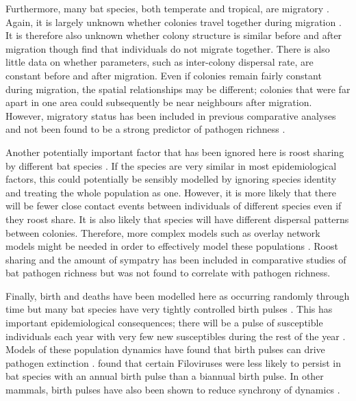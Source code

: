 Furthermore, many bat species, both temperate and tropical, are migratory \cite{fleming2003ecology, krauel2013recent, popa2009bats, hutterer2005bat}.
Again, it is largely unknown whether colonies travel together during migration \cite{baerwald2016migratory}. 
It is therefore also unknown whether colony structure is similar before and after migration \cite{carter2013cooperation} though \textcite{kurta2002philopatry} find that individuals do not migrate together.
There is also little data on whether parameters, such as inter-colony dispersal rate, are constant before and after migration.
Even if colonies remain fairly constant during migration, the spatial relationships may be different; colonies that were far apart in one area could subsequently be near neighbours after migration.
However, migratory status has been included in previous comparative analyses and not been found to be a strong predictor of pathogen richness \cite{turmelle2009correlates, maganga2014bat}. 

Another potentially important factor that has been ignored here is roost sharing by different bat species \cite{maganga2014bat, lopez2014seroprevalence, serra2002european, pons2014insights, deThoisy2016bioecological}.
If the species are very similar in most epidemiological factors, this could potentially be sensibly modelled by ignoring species identity and treating the whole population as one.
However, it is more likely that there will be fewer close contact events between individuals of different species even if they roost share.
It is also likely that species will have different dispersal patterns between colonies.
Therefore, more complex models such as overlay network models might be needed in order to effectively model these populations \cite{funk2010interacting, marceau2011modeling}.
Roost sharing and the amount of sympatry has been included in comparative studies of bat pathogen richness \cite{maganga2014bat} but was not found to correlate with pathogen richness.

Finally, birth and deaths have been modelled here as occurring randomly through time but many bat species have very tightly controlled birth pulses \cite{dietrich2015leptospira, george2011host, porter2001birth, greiner2011predictable}.
This has important epidemiological consequences; there will be a pulse of susceptible individuals each year with very few new susceptibles during the rest of the year \cite{dietrich2015leptospira}.
Models of these population dynamics have found that birth pulses can drive pathogen extinction \cite{peel2014effect}.
\textcite{hayman2015biannual} found that certain Filoviruses were less likely to persist in bat species with an annual birth pulse than a biannual birth pulse.
In other mammals, birth pulses have also been shown to reduce synchrony of dynamics \cite{duke2011strong}.

